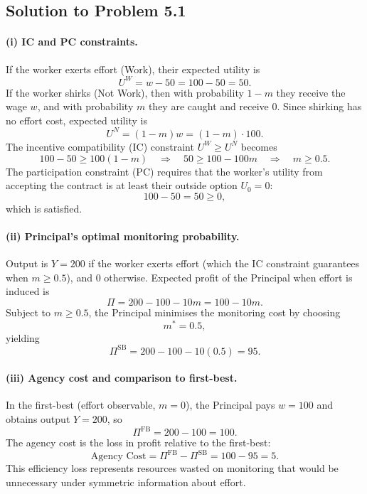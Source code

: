 \documentclass[12pt,a4paper]{article}
\begin{document}
\subsection*{Solution to Problem 5.1}

\paragraph{(i) IC and PC constraints.}
If the worker exerts effort (Work), their expected utility is
\[
  U^{W} = w - 50 = 100 - 50 = 50.
\]
If the worker shirks (Not Work), then with probability \(1-m\) they receive the wage \(w\), and with probability \(m\) they are caught and receive \(0\). Since shirking has no effort cost, expected utility is
\[
  U^{N} = (1-m)w = (1-m)\cdot 100.
\]
The incentive compatibility (IC) constraint \(U^{W} \geq U^{N}\) becomes
\[
  100 - 50 \geq 100(1-m)
  \quad\Rightarrow\quad
  50 \geq 100 - 100m
  \quad\Rightarrow\quad
  m \geq 0.5.
\]
The participation constraint (PC) requires that the worker's utility from accepting the contract is at least their outside option \(U_0 = 0\):
\[
  100 - 50 = 50 \geq 0,
\]
which is satisfied.

\paragraph{(ii) Principal's optimal monitoring probability.}
Output is \(Y = 200\) if the worker exerts effort (which the IC constraint guarantees when \(m \ge 0.5\)), and \(0\) otherwise. Expected profit of the Principal when effort is induced is
\[
  \Pi = 200 - 100 - 10m = 100 - 10m.
\]
Subject to \(m \ge 0.5\), the Principal minimises the monitoring cost by choosing
\[
  m^* = 0.5,
\]
yielding
\[
  \Pi^{\text{SB}} = 200 - 100 - 10(0.5) = 95.
\]

\paragraph{(iii) Agency cost and comparison to first-best.}
In the first-best (effort observable, \(m = 0\)), the Principal pays \(w = 100\) and obtains output \(Y = 200\), so
\[
  \Pi^{\text{FB}} = 200 - 100 = 100.
\]
The agency cost is the loss in profit relative to the first-best:
\[
  \text{Agency Cost} = \Pi^{\text{FB}} - \Pi^{\text{SB}} = 100 - 95 = 5.
\]
This efficiency loss represents resources wasted on monitoring that would be unnecessary under symmetric information about effort.
\end{document}
